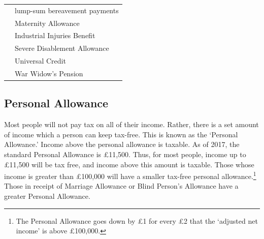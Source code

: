 \documentclass[]{tufte-handout}
\begin{document}
\begin{longtable}[]{@{}ll@{}}
\begin{minipage}[t]{0.45\columnwidth}\raggedright
\strut
\end{minipage} & \begin{minipage}[t]{0.50\columnwidth}\raggedright
lump-sum bereavement payments\strut
\end{minipage}\tabularnewline
\begin{minipage}[t]{0.45\columnwidth}\raggedright
\strut
\end{minipage} & \begin{minipage}[t]{0.50\columnwidth}\raggedright
Maternity Allowance\strut
\end{minipage}\tabularnewline
\begin{minipage}[t]{0.45\columnwidth}\raggedright
\strut
\end{minipage} & \begin{minipage}[t]{0.50\columnwidth}\raggedright
Industrial Injuries Benefit\strut
\end{minipage}\tabularnewline
\begin{minipage}[t]{0.45\columnwidth}\raggedright
\strut
\end{minipage} & \begin{minipage}[t]{0.50\columnwidth}\raggedright
Severe Disablement Allowance\strut
\end{minipage}\tabularnewline
\begin{minipage}[t]{0.45\columnwidth}\raggedright
\strut
\end{minipage} & \begin{minipage}[t]{0.50\columnwidth}\raggedright
Universal Credit\strut
\end{minipage}\tabularnewline
\begin{minipage}[t]{0.45\columnwidth}\raggedright
\strut
\end{minipage} & \begin{minipage}[t]{0.50\columnwidth}\raggedright
War Widow's Pension\strut
\end{minipage}\tabularnewline
\bottomrule
\end{longtable}

\hypertarget{personal-allowance}{%
\subsection{Personal Allowance}\label{personal-allowance}}

Most people will not pay tax on all of their income. Rather, there is a
set amount of income which a person can keep tax-free. This is known as
the `Personal Allowance.' Income above the personal allowance is
taxable. As of 2017, the standard Personal Allowance is £11,500. Thus,
for most people, income up to £11,500 will be tax free, and income above
this amount is taxable. Those whose income is greater than £100,000 will
have a smaller tax-free personal allowance.\footnote{The Personal
  Allowance goes down by £1 for every £2 that the `adjusted net income'
  is above £100,000.} Those in receipt of Marriage Allowance or Blind
Person's Allowance have a greater Personal Allowance.
\end{document}
